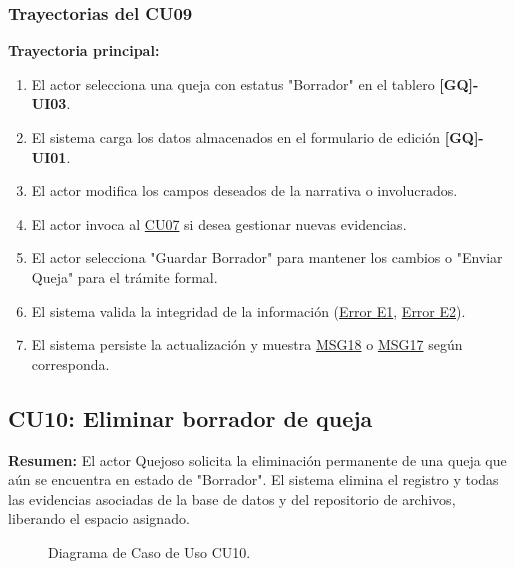 \begin{appendices}
\subsubsection{Trayectorias del CU09}
\textbf{Trayectoria principal:}
\begin{enumerate}[nosep]
    \item El actor selecciona una queja con estatus "Borrador" en el tablero \textbf{[GQ]-UI03}.
    \item El sistema carga los datos almacenados en el formulario de edición \textbf{[GQ]-UI01}.
    \item El actor modifica los campos deseados de la narrativa o involucrados.
    \item El actor invoca al \hyperlink{anexo:casos_uso}{CU07} si desea gestionar nuevas evidencias.
    \item El actor selecciona "Guardar Borrador" para mantener los cambios o "Enviar Queja" para el trámite formal.
    \item El sistema valida la integridad de la información (\hyperlink{err:E10}{Error E1}, \hyperlink{err:E11}{Error E2}).
    \item El sistema persiste la actualización y muestra \hyperlink{msg:MSG18}{MSG18} o \hyperlink{msg:MSG17}{MSG17} según corresponda.
\end{enumerate}

\newpage

\subsection{CU10: Eliminar borrador de queja}

\textbf{Resumen:} 
El actor Quejoso solicita la eliminación permanente de una queja que aún se encuentra en estado de "Borrador". El sistema elimina el registro y todas las evidencias asociadas de la base de datos y del repositorio de archivos, liberando el espacio asignado.

\begin{figure}[htbp]
    \centering
    \figCUdiez
    \caption{Diagrama de Caso de Uso CU10.}
    \label{fig:cu10}
\end{figure}


\end{appendices}
